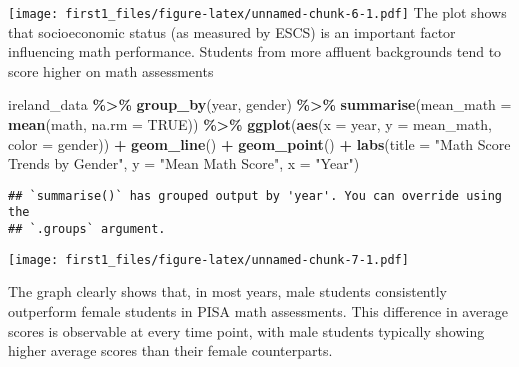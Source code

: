 \documentclass[
]{article}
\newenvironment{Shaded}{\begin{snugshade}}{\end{snugshade}}
\newcommand{\AttributeTok}[1]{\textcolor[rgb]{0.13,0.29,0.53}{#1}}
\newcommand{\CommentTok}[1]{\textcolor[rgb]{0.56,0.35,0.01}{\textit{#1}}}
\newcommand{\ConstantTok}[1]{\textcolor[rgb]{0.56,0.35,0.01}{#1}}
\newcommand{\FunctionTok}[1]{\textcolor[rgb]{0.13,0.29,0.53}{\textbf{#1}}}
\newcommand{\NormalTok}[1]{#1}
\newcommand{\OtherTok}[1]{\textcolor[rgb]{0.56,0.35,0.01}{#1}}
\newcommand{\SpecialCharTok}[1]{\textcolor[rgb]{0.81,0.36,0.00}{\textbf{#1}}}
\newcommand{\StringTok}[1]{\textcolor[rgb]{0.31,0.60,0.02}{#1}}
\begin{document}
\texttt{[image: first1\_files/figure-latex/unnamed-chunk-6-1.pdf]} The
plot shows that socioeconomic status (as measured by ESCS) is an
important factor influencing math performance. Students from more
affluent backgrounds tend to score higher on math assessments

\begin{Shaded}
\begin{Highlighting}[]
\NormalTok{ireland\_data }\SpecialCharTok{\%\textgreater{}\%}
  \FunctionTok{group\_by}\NormalTok{(year, gender) }\SpecialCharTok{\%\textgreater{}\%}
  \FunctionTok{summarise}\NormalTok{(}\AttributeTok{mean\_math =} \FunctionTok{mean}\NormalTok{(math, }\AttributeTok{na.rm =} \ConstantTok{TRUE}\NormalTok{)) }\SpecialCharTok{\%\textgreater{}\%}
  \FunctionTok{ggplot}\NormalTok{(}\FunctionTok{aes}\NormalTok{(}\AttributeTok{x =}\NormalTok{ year, }\AttributeTok{y =}\NormalTok{ mean\_math, }\AttributeTok{color =}\NormalTok{ gender)) }\SpecialCharTok{+}
  \FunctionTok{geom\_line}\NormalTok{() }\SpecialCharTok{+} \FunctionTok{geom\_point}\NormalTok{() }\SpecialCharTok{+}
  \FunctionTok{labs}\NormalTok{(}\AttributeTok{title =} \StringTok{"Math Score Trends by Gender"}\NormalTok{, }\AttributeTok{y =} \StringTok{"Mean Math Score"}\NormalTok{, }\AttributeTok{x =} \StringTok{"Year"}\NormalTok{)}
\end{Highlighting}
\end{Shaded}

\begin{verbatim}
## `summarise()` has grouped output by 'year'. You can override using the
## `.groups` argument.
\end{verbatim}

\texttt{[image: first1\_files/figure-latex/unnamed-chunk-7-1.pdf]}

The graph clearly shows that, in most years, male students consistently
outperform female students in PISA math assessments. This difference in
average scores is observable at every time point, with male students
typically showing higher average scores than their female counterparts.

\begin{Shaded}
\end{Shaded}
\end{document}
